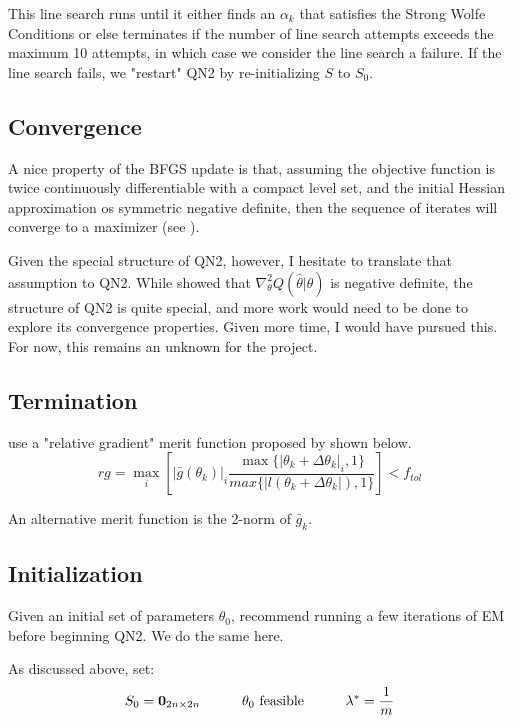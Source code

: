 \documentclass[letter,12pt]{article}
\begin{document}
This line search runs until it either finds an $\alpha_k$ that satisfies the Strong Wolfe Conditions or else terminates if the number of line search attempts exceeds the maximum 10 attempts, in which case we consider the line search a failure.  If the line search fails, we "restart" QN2 by re-initializing $S$ to $S_0$.

\subsection{Convergence}

A nice property of the BFGS update is that, assuming the objective function is twice continuously differentiable with a compact level set, and the initial Hessian approximation os symmetric negative definite, then the sequence of iterates will converge to a maximizer (see \cite{nocedalwright_BFGS}).  

Given the special structure of QN2, however, I hesitate to translate that assumption to QN2.  While \cite{jamshidianj97} showed that $\nabla_\theta^2Q(\hat{\theta}|\hat{\theta})$ is negative definite, the structure of QN2 is quite special, and more work would need to be done to explore its convergence properties.  Given more time, I would have pursued this.  For now, this remains an unknown for the project.

\subsection{Termination}

\cite{jamshidianj97} use a "relative gradient" merit function proposed by \cite{khalfan93} shown below.
\begin{equation} \label{eq:rg}
rg = \max_i
\left[
|\bar{g}(\theta_k)|_i
\frac
{\max\{|\theta_k + \Delta \theta_k|_i,1\}}
{max\{|l(\theta_k + \Delta \theta_k|),1\}}
\right]
< f_{tol}
\end{equation}

An alternative merit function is the 2-norm of $\bar{g}_k$.

\subsection{Initialization}

Given an initial set of parameters $\theta_0$, \cite{jamshidianj93} recommend running a few iterations of EM before beginning QN2.  We do the same here.

As discussed above, set:
\[
S_0 = \boldsymbol{0}_{2n \times 2n}
\indent \indent
\theta_0 \text{ feasible}
\indent \indent
\lambda^* = \frac{1}{m}
\]
\end{document}
